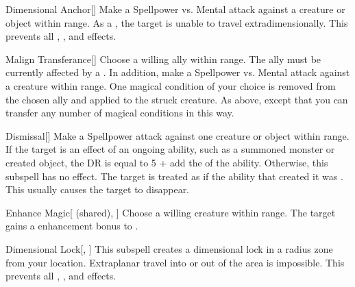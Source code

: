\begin{ability}[\nth{2}]{Dimensional Anchor}[]
Make a Spellpower vs. Mental attack against a creature or object within \rngmed range.
\hit As a , the target is unable to travel extradimensionally.
This prevents all , , and  effects.
\end{ability}
\vspace{0.25em}


\begin{ability}[\nth{2}]{Malign Transferance}[]
Choose a willing ally within \rngmed range.
The ally must be currently affected by a  .
In addition, make a Spellpower vs. Mental attack against a creature within \rngmed range.
\hit One magical condition of your choice is removed from the chosen ally and applied to the struck creature.
\crit As above, except that you can transfer any number of magical conditions in this way.
\end{ability}
\vspace{0.25em}


\begin{ability}[\nth{3}]{Dismissal}[]
Make a Spellpower attack against one creature or object within \rngmed range.
If the target is an effect of an ongoing  ability, such as a summoned monster or created object, the DR is equal to 5 + add the  of the ability.
Otherwise, this subspell has no effect.
\hit The target is treated as if the ability that created it was .
This usually causes the target to disappear.
\end{ability}
\vspace{0.25em}


\begin{ability}[\nth{4}]{Enhance Magic}[ (shared), ]
Choose a willing creature within \rngmed range.
The target gains a  enhancement bonus to .
\end{ability}
\vspace{0.25em}


\begin{ability}[\nth{5}]{Dimensional Lock}[, ]
This subspell creates a dimensional lock in a \arealarge radius zone from your location.
Extraplanar travel into or out of the area is impossible.
This prevents all , , and  effects.
\end{ability}
\vspace{0.25em}



